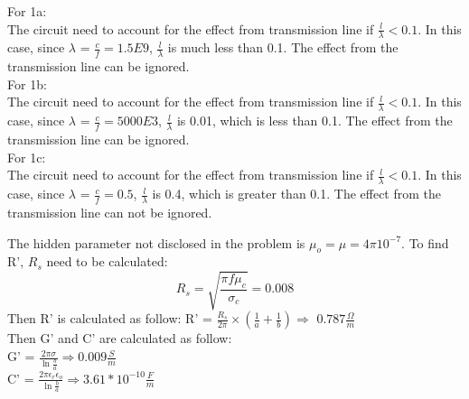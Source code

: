 \documentclass{article}
\begin{document}

\vspace{\baselineskip}




\vspace*{1cm}
\noindent For 1a: \\
\noindent The circuit need to account for the effect from transmission line if $\frac{l}{\lambda}<0.1$. In this case, since $\lambda$ = $\frac{c}{f} = 1.5E9$, $\frac{l}{\lambda}$ is much less than 0.1. The effect from the transmission line can be ignored.\\
\noindent For 1b: \\
\noindent The circuit need to account for the effect from transmission line if $\frac{l}{\lambda}<0.1$. In this case, since $\lambda$ = $\frac{c}{f} = 5000E3$, $\frac{l}{\lambda}$ is 0.01, which is less than 0.1. The effect from the transmission line can be ignored.\\
\noindent For 1c: \\
\noindent The circuit need to account for the effect from transmission line if $\frac{l}{\lambda}<0.1$. In this case, since $\lambda$ = $\frac{c}{f} = 0.5$, $\frac{l}{\lambda}$ is 0.4, which is greater than 0.1. The effect from the transmission line can not be ignored.


\newpage
{}

\vspace{\baselineskip}


\vspace*{1cm}
\noindent The hidden parameter not disclosed in the problem is $\mu_o = \mu = 4\pi 10^{-7}$. To find R', $R_s$ need to be calculated: $$R_s = \sqrt{\frac{\pi f\mu_c}{\sigma_c}}= 0.008$$
\noindent Then R' is calculated as follow:
\noindent R' = $\frac{R_s}{2\pi} \times (\frac{1}{a} + \frac{1}{b}) \Rightarrow $  $0.787 \frac{\Omega}{m}$ \\
\noindent Then G' and C' are calculated as follow:\\
\noindent G' = $\frac{2\pi \sigma}{\ln{\frac{b}{a}}} \Rightarrow 0.009 \frac{S}{m}$\\
\noindent C' = $\frac{2\pi \epsilon_r \epsilon_o}{\ln{\frac{b}{a}}} \Rightarrow 3.61 * 10^{-10} \frac{F}{m}$
\end{document}
